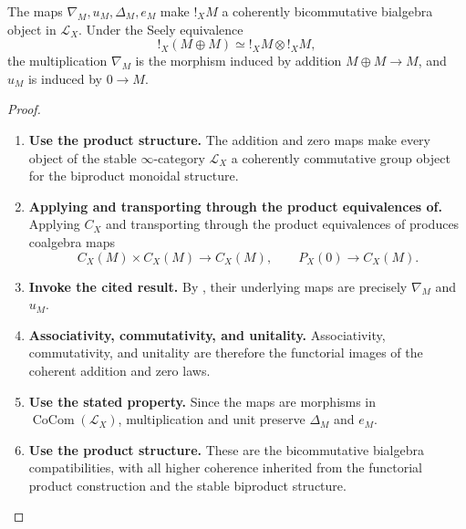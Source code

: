 \begin{proposition}
\label{prop:tangent-bialgebra-structure}
The maps \(\nabla_M,u_M,\Delta_M,e_M\) make \(!_XM\) a coherently
bicommutative bialgebra object in \(\mathcal L_X\). Under the Seely
equivalence
\[
    !_X(M\oplus M)\simeq !_XM\otimes !_XM,
\]
the multiplication \(\nabla_M\) is the morphism induced by addition
\(M\oplus M\to M\), and \(u_M\) is induced by \(0\to M\).
\end{proposition}

\begin{proof}
\leavevmode
\begin{enumerate}[label=\textup{(\arabic*)}]
    \item \textbf{Use the product structure.}
    The addition and zero maps make every object of the stable \(\infty\)-category \(\mathcal L_X\)
    a coherently commutative group object for the biproduct monoidal structure.

    \item \textbf{Applying and transporting through the product equivalences of.}
    Applying \(C_X\) and transporting through the product equivalences of
     produces coalgebra maps
    \[
        C_X(M)\times C_X(M)\longrightarrow C_X(M),
        \qquad
        P_X(0)\longrightarrow C_X(M).
    \]

    \item \textbf{Invoke the cited result.}
    By , their underlying maps are precisely
    \(\nabla_M\) and \(u_M\).

    \item \textbf{Associativity, commutativity, and unitality.}
    Associativity, commutativity, and unitality are therefore the functorial images of the
    coherent addition and zero laws.

    \item \textbf{Use the stated property.}
    Since the maps are morphisms in \(\operatorname{CoCom}(\mathcal L_X)\), multiplication and unit preserve \(\Delta_M\)
    and \(e_M\).

    \item \textbf{Use the product structure.}
    These are the bicommutative bialgebra compatibilities, with all higher coherence inherited
    from the functorial product construction and the stable biproduct structure.
\end{enumerate}
\end{proof}

